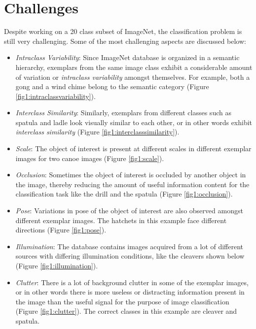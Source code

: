 \documentclass[12pt]{article}
\begin{document}
\section{Challenges}
\label{sec:challenges}
Despite working on a 20 class subset of ImageNet, the classification problem is still very challenging.
Some of the most challenging aspects are discussed below:

\begin{itemize}
\item \textit{Intraclass Variability}:
Since ImageNet database is organized in a semantic hierarchy, exemplars from the same image class exhibit a considerable amount of variation or \textit{intraclass variability} amongst themselves.
For example, both a gong and a wind chime belong to the semantic category (Figure \ref{fig1:intraclassvariability}).

\item \textit{Interclass Similarity}:
Similarly, exemplars from different classes such as spatula and ladle look visually similar to each other, or in other words exhibit \textit{interclass similarity} (Figure \ref{fig1:interclasssimilarity}).

\item \textit{Scale}:
The object of interest is present at different scales in different exemplar images for two canoe images (Figure \ref{fig1:scale}).

\item \textit{Occlusion}: Sometimes the object of interest is occluded by another object in the image, thereby reducing the amount of useful information content for the classification task like the drill and the spatula (Figure \ref{fig1:occlusion}).

\item \textit{Pose}:
Variations in pose of the object of interest are also observed amongst different exemplar images. The hatchets in this example face different directions (Figure \ref{fig1:pose}).

\item \textit{Illumination}:
The database contains images acquired from a lot of different sources with differing illumination conditions, like the cleavers shown below (Figure \ref{fig1:illumination}).

\item \textit{Clutter}: There is a lot of background clutter in some of the exemplar images, or in other words there is more useless or distracting information present in the image than the useful signal for the purpose of image classification (Figure \ref{fig1:clutter}).
The correct classes in this example are cleaver and spatula.

\end{itemize}
\end{document}

